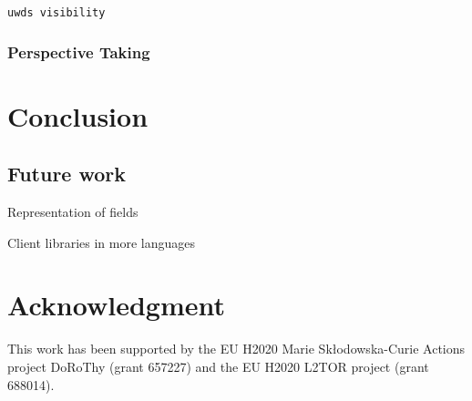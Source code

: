 \documentclass[letterpaper, 10 pt, conference]{ieeeconf}  %
\begin{document}
{\tt uwds visibility}

\subsubsection{Perspective Taking}

\section{Conclusion}

\subsection{Future work}

Representation of fields

Client libraries in more languages

\section*{Acknowledgment}

This work has been supported by the EU H2020 Marie Sk\l odowska-Curie Actions
project DoRoThy (grant 657227) and the EU H2020 L2TOR project (grant 688014).




\end{document}
